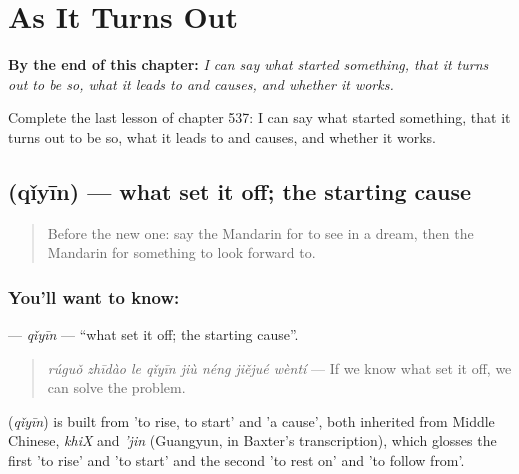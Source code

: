 
\chapter{As It Turns Out}
\label{ch:zh-as-it-turns-out}

\begin{chapteropening}
\textbf{By the end of this chapter:} \emph{I can say what started something, that it turns out to be so, what it leads to and causes, and whether it works.}

Complete the last lesson of chapter 537: I can say what started something, that it turns out to be so, what it leads to and causes, and whether it works.
\end{chapteropening}

\section[\texorpdfstring{\zh{起因} (qǐyīn)}{起因 (qǐyīn)}]{ (qǐyīn) — what set it off; the starting cause}

\label{lesson:ZH-C537-qiyin}



\begin{quote}
Before the new one: say the Mandarin for to see in a dream, then the Mandarin for something to look forward to.
\end{quote}

\subsection*{You'll want to know: }
\textbf{} — \emph{qǐyīn} — \textquotedblleft{}what set it off; the starting cause\textquotedblright{}.

\begin{quote}
\emph{rúguǒ zhīdào le qǐyīn jiù néng jiějué wèntí} — If we know what set it off, we can solve the problem.
\end{quote}

\begin{cousinweb}
\textbf{} (\emph{qǐyīn}) is built from  'to rise, to start' and  'a cause', both inherited from Middle Chinese, \emph{khiX} and \emph{'jin} (Guangyun, in Baxter's transcription), which glosses the first 'to rise' and 'to start' and the second 'to rest on' and 'to follow from'.
\end{cousinweb}

